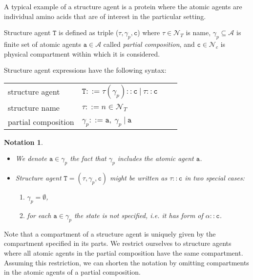 \documentclass{entcs}
\renewcommand{\~}[0]{\texttildelow}
\newcommand{\choice}{|}
\newtheorem{notation}[thm]{Notation}
\begin{document}
A typical example of a structure agent is a protein where the atomic agents are individual amino acids that are of interest in the particular setting.

\begin{definition}
Structure agent $\mathtt{T}$ is defined as triple ($\tau, \gamma_p, \mathtt{c}$) where $\tau \in \mathcal{N}_{T}$ is name, $\gamma_p \subseteq \mathcal{A}$ is finite set of atomic agents $\mathtt{a} \in \mathcal{A}$ called \emph{partial composition}, and $\mathtt{c} \in \mathcal{N}_{c}$ is physical compartment within which it is considered.
\end{definition}

Structure agent expressions have the following syntax:

\begin{center}
{\small
\hspace*{-1cm}\begin{tabular}{ ll ll }
 structure agent & $\mathtt{T} ::= \tau(\gamma_p)::\mathtt{c}~\choice~\tau::\mathtt{c}$\\
 structure name & $\tau ::= n \in \mathcal{N}_{T}$\\
 partial composition & $\gamma_p ::= \mathtt{a},~\gamma_p~\choice~\mathtt{a}$\\
\end{tabular}
}
\end{center}   

\begin{notation}
~
\begin{itemize}
\item We denote $\mathtt{a}\in\gamma_p$ the fact that $\gamma_p$ includes the atomic agent $\mathtt{a}$.
\item Structure agent $\mathtt{T} = (\tau, \gamma_p, \mathtt{c})$ might be written as $\tau::\mathtt{c}$ in two special cases:
	\begin{enumerate}
		\item $\gamma_p = \emptyset$,
		\item for each $\mathtt{a} \in \gamma_p$ the state is not specified, i.e. it has form of $\alpha::\mathtt{c}$.
	\end{enumerate}
\end{itemize}
\end{notation}

Note that a compartment of a structure agent is uniquely given by the compartment specified in its parts. We restrict ourselves to structure agents where all atomic agents in the partial composition have the same compartment. Assuming this restriction, we can shorten the notation by omitting compartments in the atomic agents of a partial composition. 
\end{document}
